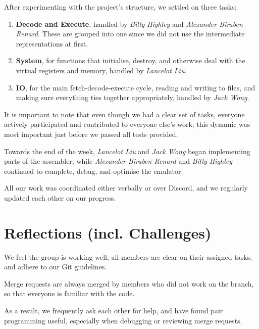 \documentclass{ictex}
\begin{document}
After experimenting with the project's structure, we settled on three tasks:

\begin{enumerate}
    \item \textbf{Decode and Execute}, handled by \textit{Billy Highley} and \textit{Alexander Biraben-Renard}. These are grouped into one since we did not use the intermediate representations at first.
    \item \textbf{System}, for functions that initialise, destroy, and otherwise deal with the virtual registers and memory, handled by \textit{Lancelot Liu}.
    \item \textbf{IO}, for the main fetch-decode-execute cycle, reading and writing to files, and making sure everything ties together appropriately, handled by \textit{Jack Wong}.
\end{enumerate}

\vspace{1em} \begin{formal}
    It is important to note that even though we had a clear set of tasks, everyone actively participated and contributed to everyone else's work; this dynamic was most important just before we passed all tests provided.
\end{formal}

Towards the end of the week, \textit{Lancelot Liu} and \textit{Jack Wong} began implementing parts of the assembler, while \textit{Alexander Biraben-Renard} and \textit{Billy Highley} continued to complete, debug, and optimise the emulator.

All our work was coordinated either verbally or over Discord, and we regularly updated each other on our progress.

\section{Reflections (incl. Challenges)}

We feel the group is working well; all members are clear on their assigned tasks, and adhere to our Git guidelines.

\vspace{1em} \begin{formal}
    Merge requests are always merged by members who did not work on the branch, so that everyone is familiar with the code.
\end{formal}

As a result, we frequently ask each other for help, and have found pair programming useful, especially when debugging or reviewing merge requests.
\end{document}
